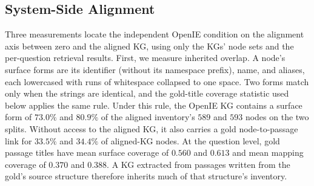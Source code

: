 \documentclass[11pt]{article}
\begin{document}
\begin{table}[ht]\centering\footnotesize
\setlength{\tabcolsep}{3pt}
\caption{MetaQA under the full KB restricted to the corpus (not induced from the evaluated questions; index over all $1{,}250$ passages, gold fraction $0.31$), compared with the aligned arm (Aligned), the independent OpenIE KG, and BM25. Exact sign-test $p$: hybrid $8.6\times10^{-4}$ and $2.6\times10^{-3}$, PPR $1.8\times10^{-3}$ and $1.2\times10^{-4}$, hybrid-PPR $0.45$ and $0.63$.}
\label{tab:fullkb}
\end{table}

\subsection{System-Side Alignment}
\label{app:systemside}
Three measurements locate the independent OpenIE condition on the alignment axis between zero and the aligned KG, using only the KGs' node sets and the per-question retrieval results. First, we measure inherited overlap. A node's surface forms are its identifier (without its namespace prefix), name, and aliases, each lowercased with runs of whitespace collapsed to one space. Two forms match only when the strings are identical, and the gold-title coverage statistic used below applies the same rule. Under this rule, the OpenIE KG contains a surface form of $73.0\%$ and $80.9\%$ of the aligned inventory's $589$ and $593$ nodes on the two splits. Without access to the aligned KG, it also carries a gold node-to-passage link for $33.5\%$ and $34.4\%$ of aligned-KG nodes. At the question level, gold passage titles have mean surface coverage of $0.560$ and $0.613$ and mean mapping coverage of $0.370$ and $0.388$. A KG extracted from passages written from the gold's source structure therefore inherits much of that structure's inventory.
\end{document}

